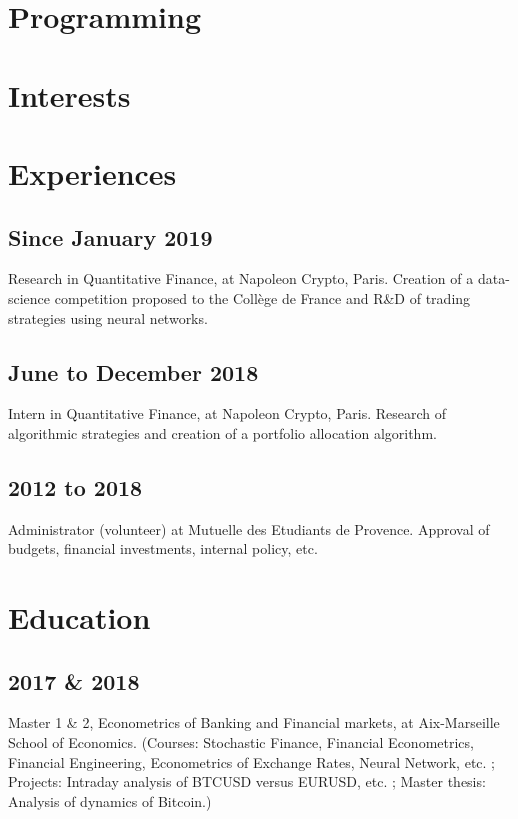 \documentclass[a4paper,11pt]{arthur-cv}
\begin{document}
\begin{textblock}{17}
\begin{minipage}[t]{0.33\textwidth}
    \section{Programming}

    \section{Interests}

  \end{minipage}
  \begin{minipage}[t]{0.66\textwidth}
  
    \section{Experiences}
      \subsection{Since January 2019}{Research in Quantitative Finance, at Napoleon Crypto, Paris. Creation of a data-science competition proposed to the Collège de France and  R\&D of trading strategies using neural networks.}
      \subsection{June to December 2018}{Intern in Quantitative Finance, at Napoleon Crypto, Paris. Research of algorithmic strategies and creation of a portfolio allocation algorithm.}
      \subsection{2012 to 2018}{Administrator (volunteer) at Mutuelle des Etudiants de Provence. Approval of budgets, financial investments, internal policy, etc.}

   \section{Education}
      \subsection{2017 \& 2018}{Master 1 \& 2, Econometrics of Banking and Financial markets, at Aix-Marseille School of Economics. (Courses: Stochastic Finance, Financial Econometrics, Financial Engineering, Econometrics of Exchange Rates, Neural Network, etc. ; Projects: Intraday analysis of BTCUSD versus EURUSD, etc. ; Master thesis: Analysis of dynamics of Bitcoin.)}

\end{minipage}
\end{textblock}
\end{document}
